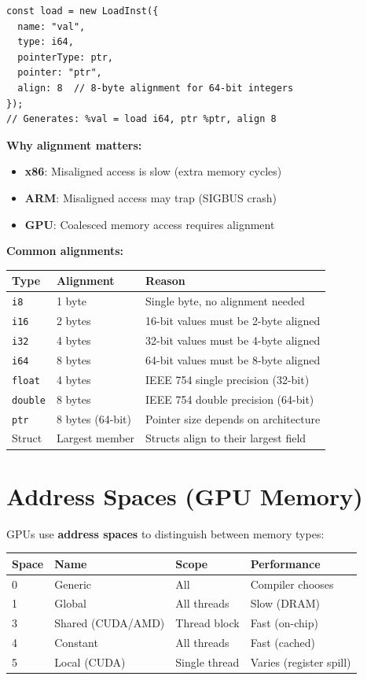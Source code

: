 \documentclass[11pt,oneside]{book}
\begin{document}
\begin{lstlisting}[style=ts]
const load = new LoadInst({
  name: "val",
  type: i64,
  pointerType: ptr,
  pointer: "ptr",
  align: 8  // 8-byte alignment for 64-bit integers
});
// Generates: %val = load i64, ptr %ptr, align 8
\end{lstlisting}

\textbf{Why alignment matters:}
\begin{itemize}[noitemsep]
  \item \textbf{x86}: Misaligned access is slow (extra memory cycles)
  \item \textbf{ARM}: Misaligned access may trap (SIGBUS crash)
  \item \textbf{GPU}: Coalesced memory access requires alignment
\end{itemize}

\textbf{Common alignments:}
\begin{longtable}{|p{3cm}|p{3cm}|p{7cm}|}
\hline
\textbf{Type} & \textbf{Alignment} & \textbf{Reason} \\
\hline
\texttt{i8} & 1 byte & Single byte, no alignment needed \\
\hline
\texttt{i16} & 2 bytes & 16-bit values must be 2-byte aligned \\
\hline
\texttt{i32} & 4 bytes & 32-bit values must be 4-byte aligned \\
\hline
\texttt{i64} & 8 bytes & 64-bit values must be 8-byte aligned \\
\hline
\texttt{float} & 4 bytes & IEEE 754 single precision (32-bit) \\
\hline
\texttt{double} & 8 bytes & IEEE 754 double precision (64-bit) \\
\hline
\texttt{ptr} & 8 bytes (64-bit) & Pointer size depends on architecture \\
\hline
Struct & Largest member & Structs align to their largest field \\
\hline
\end{longtable}

\section{Address Spaces (GPU Memory)}

GPUs use \textbf{address spaces} to distinguish between memory types:

\begin{longtable}{|p{2cm}|p{3.5cm}|p{2.5cm}|p{5cm}|}
\hline
\textbf{Space} & \textbf{Name} & \textbf{Scope} & \textbf{Performance} \\
\hline
0 & Generic & All & Compiler chooses \\
\hline
1 & Global & All threads & Slow (DRAM) \\
\hline
3 & Shared (CUDA/AMD) & Thread block & Fast (on-chip) \\
\hline
4 & Constant & All threads & Fast (cached) \\
\hline
5 & Local (CUDA) & Single thread & Varies (register spill) \\
\hline
\end{longtable}
\end{document}

